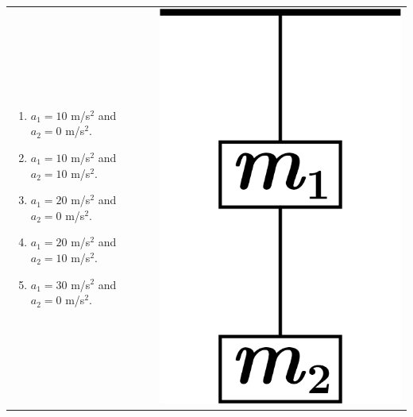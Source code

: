 \documentclass[12pt,letterpaper]{article}
\begin{document}
\begin{enumerate}
\begin{tabular}{l r}
\begin{minipage}{0.8\textwidth}
\begin{enumerate}
\item $a_1 = 10$ m/s$^2$ and $a_2 = 0$ m/s$^2$.
\item $a_1 = 10$ m/s$^2$ and $a_2 = 10$ m/s$^2$.
\item $a_1 = 20$ m/s$^2$ and $a_2 = 0$ m/s$^2$.
\item $a_1 = 20$ m/s$^2$ and $a_2 = 10$ m/s$^2$.
\item $a_1 = 30$ m/s$^2$ and $a_2 = 0$ m/s$^2$.
\end{enumerate}
\end{minipage} &
\begin{minipage}{0.1\textwidth}
\includegraphics[width=\textwidth]{suspension.png}
\end{minipage}
\end{tabular}


\end{enumerate}
\end{document}
